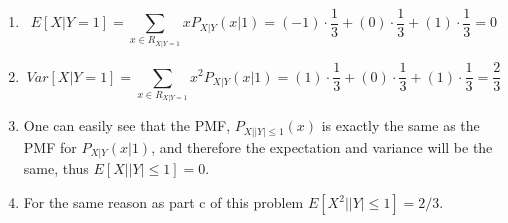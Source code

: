 \begin{problem}{10} $ $

\begin{enumerate}

\item 

\begin{equation*}
E[X|Y=1] = \sum_{x \in R_{X|Y=1}} x P_{X|Y}(x|1) = (-1)\cdot \frac{1}{3}+(0)\cdot \frac{1}{3}+(1)\cdot \frac{1}{3} =0
\end{equation*}

\item

\begin{equation*}
Var[X|Y=1] = \sum_{x \in R_{X|Y=1}} x^2 P_{X|Y}(x|1) = (1)\cdot \frac{1}{3}+(0)\cdot \frac{1}{3}+(1)\cdot \frac{1}{3} = \frac{2}{3}
\end{equation*}

\item One can easily see that the PMF, $P_{X||Y| \le 1}(x)$ is exactly the same as the PMF for $P_{X|Y}(x|1)$, and therefore the expectation and variance will be the same, thus $E[X||Y| \le 1] =0$.

\item For the same reason as part c of this problem $E[X^2||Y| \le 1] =2/3$.

\end{enumerate}
\end{problem}


